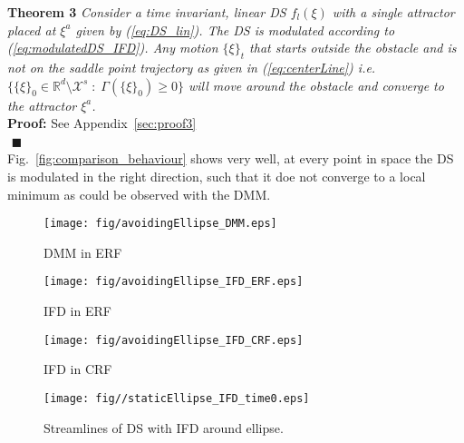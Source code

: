 \noindent \textbf{Theorem 3}
\textit{Consider a time invariant, linear DS $f_l(\xi)$ with a single attractor placed at $\xi^a$ given by (\ref{eq:DS_lin}). The DS is modulated according to (\ref{eq:modulatedDS_IFD}). Any motion $\{\xi\}_t$ that starts outside the obstacle and is not on the saddle point trajectory as given in (\ref{eq:centerLine}) i.e. $\{ \{\xi\}_0 \in \mathbb{R}^d \setminus \mathcal{X}^s \; : \; \Gamma(\{\xi\}_0) \geq 0\}$ will move around the obstacle and converge to the attractor $\xi^a$.} \\
\textbf{Proof:} See Appendix~\ref{sec:proof3} \\
${}$ \hfill $\blacksquare$ \\
Fig.~\ref{fig:comparison_behaviour} shows very well, at every point in space the DS is modulated in the right direction, such that it doe not converge to a local minimum as could be observed with the DMM.
\begin{figure*}[tb]\centering
\begin{subfigure}{.215\textwidth} %
\centering
\texttt{[image: fig/avoidingEllipse\_DMM.eps]}
\caption{DMM in ERF}
\label{fig:avoidingEllipse_DMM}
\end{subfigure} %
\begin{subfigure}{.215\textwidth} %
\centering
\texttt{[image: fig/avoidingEllipse\_IFD\_ERF.eps]}
\caption{IFD in ERF}
\label{fig:avoidingEllipse_IFD_ERF}
\end{subfigure}
\begin{subfigure}{.285\textwidth} %
\centering
\texttt{[image: fig/avoidingEllipse\_IFD\_CRF.eps]}
\caption{IFD in CRF}
\label{fig:avoidingEllipse_IFD_CRF}
\end{subfigure}
\begin{subfigure}{.24\textwidth} %
\centering
\texttt{[image: fig//staticEllipse\_IFD\_time0.eps]}
\caption{Streamlines of DS with IFD around ellipse.}
\label{fig:avoidingEllipse_IFD}
\end{subfigure}
\caption{Fig. (a) \& (b) show the comparison between the two alogirthms, where the tangent (green) stays the same, but the normal (red) changes. Furthermore, initial linear DS (blue arrows) is modulated differently to the final dynamics (blue arrows), as a result of the basis vectors. The pseudo normal (green) and tangent (red) in (a) is evaluated by stretching the space and the corresponding actual normal and tangent on the uniit circle in (c). It can be seen in (d) that this new modulation rotates the DS away from the centerline and around the ellipse.}
\label{fig:comparison_behaviour}
\end{figure*}



